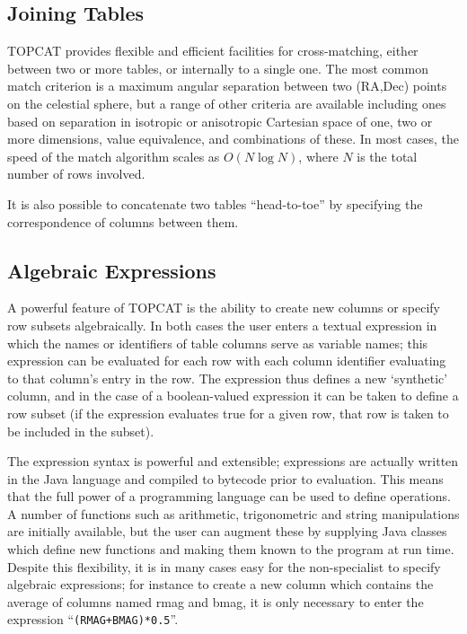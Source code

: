 \documentclass[11pt,twoside]{article}  %
\begin{document}
\subsection{Joining Tables}

TOPCAT provides flexible and efficient facilities for cross-matching,
either between two or more tables, or internally to a single one.
The most common match criterion is a maximum angular separation between
two (RA,Dec) points on the celestial sphere, but a range of other
criteria are available including ones based on 
separation in isotropic or anisotropic Cartesian space of one, two or
more dimensions, 
value equivalence,
and combinations of these.
In most cases, the speed of the match algorithm
scales as $O(N \log N)$, where $N$ is the total number of rows
involved.

It is also possible to concatenate two tables ``head-to-toe'' by
specifying the correspondence of columns between them.

\subsection{Algebraic Expressions}

A powerful feature of TOPCAT is the ability to create new columns 
or specify row subsets algebraically.  In both cases the user 
enters a textual expression in which the names or identifiers of
table columns serve as variable names; this expression 
can be evaluated for each row with each column identifier evaluating
to that column's entry in the row.  The expression thus defines a
new `synthetic' column, and in the case of a boolean-valued expression 
it can be taken to define a row subset (if the expression evaluates true for 
a given row, that row is taken to be included in the subset).

The expression syntax is powerful and extensible; expressions are
actually written in the Java language and compiled to bytecode 
prior to evaluation.
This means that the full power of a programming language can be
used to define operations.  A number of functions such as arithmetic,
trigonometric and string manipulations are initially available,
but the user can augment these by supplying Java classes which
define new functions and making them known to the program at run time.
Despite this flexibility, it is in many cases easy for
the non-specialist to specify algebraic expressions; 
for instance to create a new column which contains the average
of columns named {\sc rmag} and {\sc bmag}, it is only necessary to enter the
expression ``{\tt (RMAG+BMAG)*0.5}''.
\end{document}
